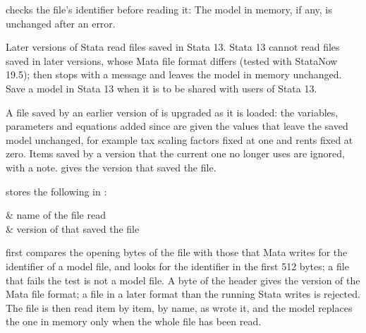  checks the file's identifier before reading it:
The model in memory, if any, is unchanged after an error.


Later versions of Stata read files saved in Stata 13. Stata 13 cannot read
files saved in later versions, whose Mata file format differs (tested with
StataNow 19.5);  then stops with a message and leaves the model in
memory unchanged. Save a model in Stata 13 when it is to be shared with users of
Stata 13.

A file saved by an earlier version of \pkg is upgraded as it is loaded: the
variables, parameters and equations added since are given the values that
leave the saved model unchanged, for example tax scaling factors fixed at one
and rents fixed at zero. Items saved by a version that the current one no
longer uses are ignored, with a note.  gives the version that
saved the file.


 stores the following in :
\begin{storedres}
 & name of the file read\\
 & version of \pkg that saved the file\\
\end{storedres}


 first compares the opening bytes of the file with those that
Mata writes for the identifier of a model file, and looks for the identifier
 in the first 512 bytes; a file that fails the test is not
a model file. A byte of the header gives the version of the Mata file format;
a file in a later format than the running Stata writes is rejected. The file
is then read item by item, by name, as  wrote it, and the
model replaces the one in memory only when the whole file has been read.


\begin{alsosee}
\end{alsosee}
